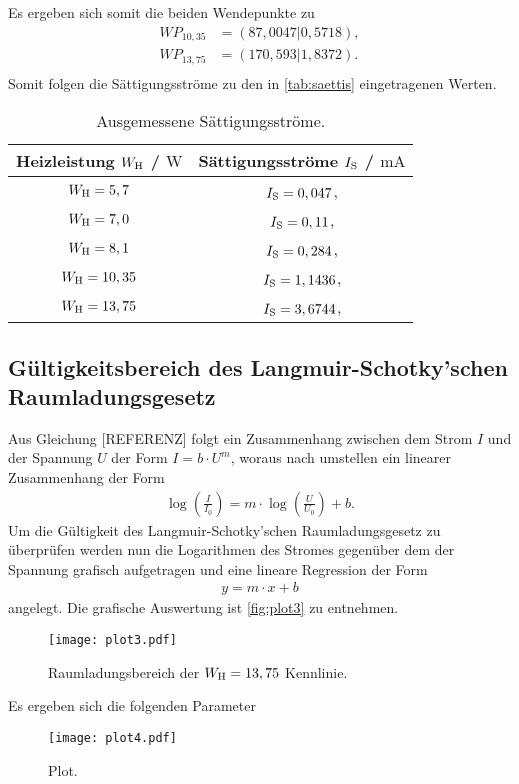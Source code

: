 \noindent
Es ergeben sich somit die beiden Wendepunkte zu
\begin{align*}
  WP_{10,35} &= (87,0047 | 0,5718), \\
  WP_{13,75} &= (170,593 | 1,8372). \\
\end{align*}
Somit folgen die Sättigungsströme zu den in \autoref{tab:saettis} eingetragenen Werten.

\begin{table}[H]
  \caption{Ausgemessene Sättigungsströme.}
  \label{tab:saettis}
  \centering
  \begin{tabular}{c c}
      \toprule
      Heizleistung $W_{\text H}$ / $\si{\watt}$ & Sättigungsströme $I_{\text S}$ / $\si{\milli\ampere}$ \\
      \midrule
      $W_{\text H} = 5,7$ & $I_{\text S} = 0,047$, \\
      $W_{\text H} = 7,0$ & $I_{\text S} = 0,11$, \\
      $W_{\text H} = 8,1$ & $I_{\text S} = 0,284$, \\
      $W_{\text H} = 10,35$ & $I_{\text S} = 1,1436$, \\
      $W_{\text H} = 13,75$ & $I_{\text S} = 3,6744$, \\
      \bottomrule
    \end{tabular}
\end{table}

\subsection{Gültigkeitsbereich des Langmuir-Schotky'schen Raumladungsgesetz}
\label{subsec:langmuirSchottky}

Aus Gleichung [REFERENZ] folgt ein Zusammenhang zwischen dem Strom $I$ und der Spannung $U$ der Form $I=b\cdot U^m$, woraus nach umstellen ein linearer Zusammenhang der Form
\begin{align}
  \log\left(\frac{I}{I_0}\right) = m \cdot \log\left(\frac{U}{U_0}\right) +b.
\end{align}
Um die Gültigkeit des Langmuir-Schotky'schen Raumladungsgesetz zu überprüfen werden nun die Logarithmen des Stromes gegenüber dem der Spannung grafisch aufgetragen und
eine lineare Regression der Form
\begin{align*}
  y=m\cdot x+b
\end{align*}
angelegt. Die grafische Auswertung ist \autoref{fig:plot3} zu entnehmen.

\begin{figure}
  \centering
  \texttt{[image: plot3.pdf]}
  \caption{Raumladungsbereich der $W_{\text H} = 13,75$ Kennlinie.}
  \label{fig:plot3}
\end{figure}

\noindent
Es ergeben sich die folgenden Parameter

\begin{figure}
  \centering
  \texttt{[image: plot4.pdf]}
  \caption{Plot.}
  \label{fig:plot4}
\end{figure}
